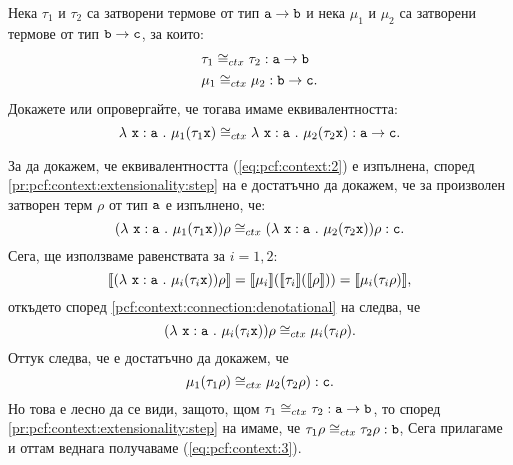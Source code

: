 \begin{problem}

  
  Нека $\tau_1$ и $\tau_2$ са затворени термове от тип $\texttt{a}\to\texttt{b}$ и
  нека $\mu_1$ и $\mu_2$ са затворени термове от тип $\texttt{b}\to\texttt{c}$, за които:
  \begin{align*}
    & \tau_1 \cong_{ctx} \tau_2 : \texttt{a}\to\texttt{b}\\
    & \mu_1 \cong_{ctx} \mu_2 : \texttt{b}\to\texttt{c}.
  \end{align*}
  Докажете или опровергайте, че тогава имаме еквивалентността:
  \begin{equation}
    \label{eq:pcf:context:2}
    \lambda~\texttt{x}:\texttt{a}~.~{\mu_1(\tau_1 \texttt{x})} \cong_{ctx} \lambda~\texttt{x}:\texttt{a}~.~{\mu_2(\tau_2 \texttt{x})} : \texttt{a}\to\texttt{c}.
  \end{equation}
\end{problem}
\begin{hint}
  За да докажем, че еквивалентността (\ref{eq:pcf:context:2}) е изпълнена, според \ref{pr:pcf:context:extensionality:step} на  е достатъчно да докажем, че за произволен затворен терм $\rho$ от тип $\texttt{a}$ е изпълнено, че:
  \[(\lambda~\texttt{x}:\texttt{a}~.~{\mu_1(\tau_1 \texttt{x})})\rho \cong_{ctx} (\lambda~\texttt{x}:\texttt{a}~.~{\mu_2(\tau_2 \texttt{x})})\rho : \texttt{c}.\]
  Сега, ще използваме равенствата за $i = 1,2$:
  \[\llbracket{(\lambda~\texttt{x}:\texttt{a}~.~{\mu_i(\tau_i \texttt{x})})\rho}\rrbracket= \llbracket{\mu_i}\rrbracket(\llbracket{\tau_i}\rrbracket(\llbracket{\rho}\rrbracket)) = \llbracket{\mu_i(\tau_i \rho)}\rrbracket,\]
  откъдето според \ref{pcf:context:connection:denotational} на  следва, че
  \[(\lambda~\texttt{x}:\texttt{a}~.~{\mu_i(\tau_i \texttt{x})})\rho \cong_{ctx} \mu_i(\tau_i \rho).\]
  Оттук следва, че е достатъчно да докажем, че
  \begin{equation}
    \label{eq:pcf:context:3}
    \mu_1(\tau_1 \rho) \cong_{ctx} \mu_2(\tau_2 \rho) : \texttt{c}.
  \end{equation}
  Но това е лесно да се види, защото, щом $\tau_1 \cong_{ctx} \tau_2 : \texttt{a}\to\texttt{b}$,
  то според \ref{pr:pcf:context:extensionality:step} на  имаме, че
  $\tau_1\rho \cong_{ctx} \tau_2\rho : \texttt{b}$,
  Сега прилагаме  и оттам веднага получаваме (\ref{eq:pcf:context:3}).
\end{hint}


